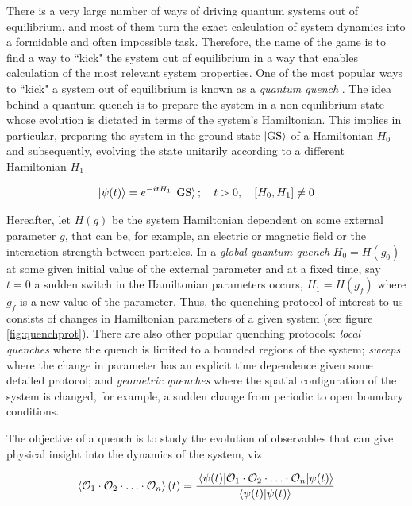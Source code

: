 There is a very large number of ways of driving quantum systems out of equilibrium, and most of them turn the exact calculation of system dynamics into a formidable and often impossible task. Therefore, the name of the game is to find a way to ``kick" the system out of equilibrium in a way that enables calculation of the most relevant system properties. One of the most popular ways to ``kick" a system out of equilibrium is known as a \emph{quantum quench} . The idea behind a quantum quench is to prepare the system in a non-equilibrium state whose evolution is dictated in terms of the system's Hamiltonian. This implies in particular, preparing the system in the ground state $\ket{\textrm{GS}}$ of a Hamiltonian $H_0$ and subsequently, evolving the state unitarily according to a different Hamiltonian $H_1$ 

\begin{equation*}
	\ket{\psi(t)} = e^{-i t H_1} \ket{\textrm{GS}};\quad t>0, \quad \comm{H_0}{H_1}\neq 0
\end{equation*}

Hereafter, let $H(g)$ be the system Hamiltonian dependent on some external parameter $g$, that can be, for example, an electric or magnetic field or the interaction strength between particles. In a \emph{global quantum quench} $H_0 = H(g_0)$ at some given initial value of the external parameter and at a fixed time, say $t=0$ a sudden switch in the Hamiltonian parameters occurs, $H_1=H(g_f)$ where $g_f$ is a new value of the parameter. Thus, the quenching protocol of interest to us consists of changes in Hamiltonian parameters of a given system (see figure \ref{fig:quenchprot}). There are also other popular quenching protocols: \emph{local quenches} where the quench is limited to a bounded regions of the system; \emph{sweeps} where the change in parameter has an explicit time dependence given some detailed protocol; and \emph{geometric quenches} where the spatial configuration of the system is changed, for example, a sudden change from periodic to open boundary conditions.

The objective of a quench is to study the evolution of observables that can give physical insight into the dynamics of the system, viz 

\begin{equation}
\expval{\mathcal{O}_1\cdot\mathcal{O}_2\cdot\ldots\cdot\mathcal{O}_n}(t) = \frac{\ev{\mathcal{O}_1\cdot\mathcal{O}_2\cdot\ldots\cdot\mathcal{O}_n}{\psi(t)}}{\ip{\psi(t)}}
\label{eq:expvalops}
\end{equation}

